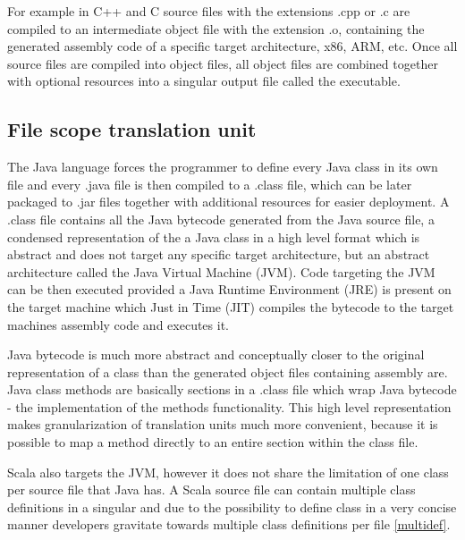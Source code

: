 \documentclass{VUMIFPSbakalaurinis}
\begin{document}
For example in C++ and C source files with the extensions .cpp or .c are compiled to an intermediate object file with the extension .o, containing the generated assembly code of a specific target architecture, x86, ARM, etc.
Once all source files are compiled into object files, all object files are combined together with optional resources into a singular output file called the executable.

\subsection{File scope translation unit}
The Java language forces the programmer to define every Java class in its own file and every .java file is then compiled to a .class file, which can be later packaged to .jar files together with additional resources for easier deployment.
A .class file contains all the Java bytecode generated from the Java source file, a condensed representation of the a Java class in a high level format which is abstract and does not target any specific target architecture, but an abstract architecture called the Java Virtual Machine (JVM).
Code targeting the JVM can be then executed provided a Java Runtime Environment (JRE) is present on the target machine which Just in Time (JIT) compiles the bytecode to the target machines assembly code and executes it.

Java bytecode is much more abstract and conceptually closer to the original representation of a class than the generated object files containing assembly are.
Java class methods are basically sections in a .class file \cite{JvmMethods} which wrap Java bytecode - the implementation of the methods functionality.
This high level representation makes granularization of translation units much more convenient, because it is possible to map a method directly to an entire section within the class file.

Scala also targets the JVM, however it does not share the limitation of one class per source file that Java has.
A Scala source file can contain multiple class definitions in a singular and due to the possibility to define class in a very concise manner developers gravitate towards multiple class definitions per file \ref{multidef}.



\end{document}
